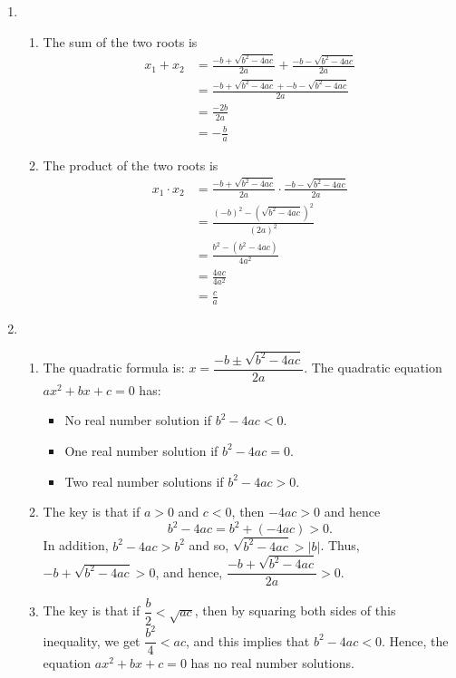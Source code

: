 \begin{enumerate}
\item \begin{enumerate} 
\item The sum of the two roots is
\begin{align*}
x_1 +  x_2 &= \frac{-b + \sqrt{b^2 - 4ac}}{2a} + \frac{-b - \sqrt{b^2 - 4ac}}{2a} \\
          &= \frac{-b + \sqrt{b^2 - 4ac} + -b - \sqrt{b^2 - 4ac}}{2a} \\
          &= \frac{-2b}{2a} \\
          &= - \frac{b}{a}
\end{align*}

\item The product of the two roots is
\begin{align*}
x_1 \cdot x_2 &= \frac{-b + \sqrt{b^2 - 4ac}}{2a} \cdot \frac{-b - \sqrt{b^2 - 4ac}}{2a} \\
          &= \frac{(-b)^2 - \left( \sqrt{b^2 - 4ac} \right)^2}{(2a)^2} \\
          &= \frac{b^2 - \left(b^2 - 4ac \right)}{4a^2} \\
          &= \frac{4ac}{4a^2} \\
          &= \frac{c}{a}
\end{align*}

\end{enumerate}




\item \begin{enumerate} 
\item The quadratic formula is:  $x = \dfrac{-b \pm \sqrt{b^2 - 4ac}}{2a}$.  The quadratic equation $ax^2 + bx + c = 0$ has:
\begin{itemize}
\item No real number solution if $b^2 - 4ac < 0$.
\item One real number solution if $b^2 - 4ac = 0$.
\item Two real number solutions if $b^2 - 4ac > 0$.
\end{itemize}

\item The key is that if $a > 0$ and $c < 0$, then $-4ac > 0$ and hence 
\[
b^2 - 4ac = b^2 + \left( -4ac \right) > 0.
\]
In addition, $b^2 - 4ac > b^2$ and so, $\sqrt{b^2 - 4ac} > \left| b \right|$.  Thus, \\
$-b + \sqrt{b^2 - 4ac} > 0$, and hence, $\dfrac{-b + \sqrt{b^2 - 4ac}}{2a} > 0$.

\item The key is that if $\dfrac{b}{2} < \sqrt{ac}$, then by squaring both sides of this inequality, we get $\dfrac{b^2}{4} < ac$, and this implies that $b^2 - 4ac < 0$.  Hence, the equation $ax^2 + bx + c = 0$ has no real number solutions.
\end{enumerate}
\end{enumerate}


